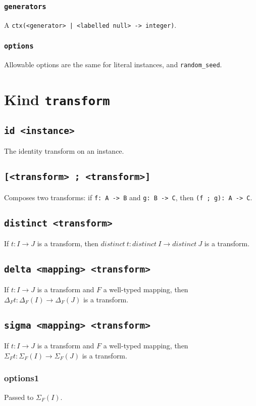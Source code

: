 \documentclass[10pt]{book}
\begin{document}
\subsection{{\tt generators}}
A {\tt ctx(<generator> | <labelled null> -> integer)}.

\subsection{{\tt options}}
Allowable options are the same for literal instances, and {\tt random\_seed}.

\chapter{Kind {\tt transform}}
\section{{\tt id <instance>}}
The identity transform on an instance.
\section{{\tt [<transform> ; <transform>]}}
Composes two transforms: if {\tt f: A -> B} and {\tt g: B -> C}, then {\tt (f ; g): A -> C}.

\section{{\tt distinct <transform>}}
If $t : I \to J$ is a transform, then $distinct \ t : distinct \ I \to distinct \ J$ is a transform.

\section{{\tt delta <mapping> <transform>}}
If $t : I \to J$ is a transform and $F$ a well-typed mapping, then $\Delta_Ft : \Delta_F(I) \to \Delta_F(J)$ is a transform.

\section{{\tt sigma <mapping> <transform>}}
If $t : I \to J$ is a transform and $F$ a well-typed mapping, then $\Sigma_Ft : \Sigma_F(I) \to \Sigma_F(J)$ is a transform.
\subsection{options1}
Passed to $\Sigma_F(I)$.
\end{document}
